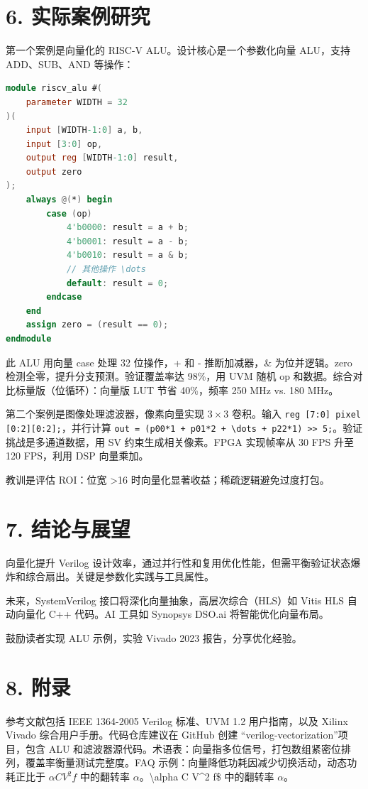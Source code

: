 \chapter{6. 实际案例研究}
第一个案例是向量化的 RISC-V ALU。设计核心是一个参数化向量 ALU，支持 ADD、SUB、AND 等操作：\par
\begin{lstlisting}[language=verilog]
module riscv_alu #(
    parameter WIDTH = 32
)(
    input [WIDTH-1:0] a, b,
    input [3:0] op,
    output reg [WIDTH-1:0] result,
    output zero
);
    always @(*) begin
        case (op)
            4'b0000: result = a + b;
            4'b0001: result = a - b;
            4'b0010: result = a & b;
            // 其他操作 \dots
            default: result = 0;
        endcase
    end
    assign zero = (result == 0);
endmodule
\end{lstlisting}
此 ALU 用向量 case 处理 32 位操作，+ 和 - 推断加减器，\&{} 为位并逻辑。zero 检测全零，提升分支预测。验证覆盖率达 98\%{}，用 UVM 随机 op 和数据。综合对比标量版（位循环）：向量版 LUT 节省 40\%{}，频率 250 MHz vs. 180 MHz。\par
第二个案例是图像处理滤波器，像素向量实现 $3 \times 3$ 卷积。输入 \texttt{reg [7:0] pixel [0:2][0:2];}，并行计算 \texttt{out = (p00*1 + p01*2 + \textbackslash{}dots + p22*1) >> 5;}。验证挑战是多通道数据，用 SV 约束生成相关像素。FPGA 实现帧率从 30 FPS 升至 120 FPS，利用 DSP 向量乘加。\par
教训是评估 ROI：位宽 >16 时向量化显著收益；稀疏逻辑避免过度打包。\par
\chapter{7. 结论与展望}
向量化提升 Verilog 设计效率，通过并行性和复用优化性能，但需平衡验证状态爆炸和综合扇出。关键是参数化实践与工具属性。\par
未来，SystemVerilog 接口将深化向量抽象，高层次综合（HLS）如 Vitis HLS 自动向量化 C++ 代码。AI 工具如 Synopsys DSO.ai 将智能优化向量布局。\par
鼓励读者实现 ALU 示例，实验 Vivado 2023 报告，分享优化经验。\par
\chapter{8. 附录}
参考文献包括 IEEE 1364-2005 Verilog 标准、UVM 1.2 用户指南，以及 Xilinx Vivado 综合用户手册。代码仓库建议在 GitHub 创建 ``verilog-vectorization''项目，包含 ALU 和滤波器源代码。术语表：向量指多位信号，打包数组紧密位排列，覆盖率衡量测试完整度。FAQ 示例：向量降低功耗因减少切换活动，动态功耗正比于 $\alpha C V^2 f$ 中的翻转率 $\alpha$。\textbackslash{}alpha C V\^{}2 f\${} 中的翻转率 $\alpha$。\par
